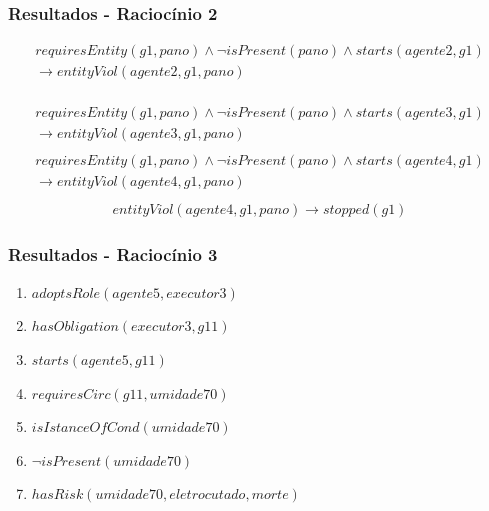 \documentclass{beamer}
\begin{document}
\begin{frame}
	\frametitle{Resultados - Raciocínio 2}
	\begin{eqnarray}\nonumber
		requiresEntity(g1,pano) \wedge \neg isPresent(pano) \wedge starts(agente2,g1)  \nonumber \\ 
		\to entityViol(agente2,g1,pano) \nonumber \\ 	    
	\end{eqnarray}

	\begin{eqnarray}\nonumber
		requiresEntity(g1,pano) \wedge \neg isPresent(pano) \wedge starts(agente3,g1) \nonumber \\ 
	    \to entityViol(agente3,g1,pano) \nonumber \\
	\end{eqnarray}
	\begin{eqnarray}\nonumber
		requiresEntity(g1,pano) \wedge \neg isPresent(pano) \wedge starts(agente4,g1) \nonumber \\ 
	    \to entityViol(agente4,g1,pano)  \nonumber \\	
	\end{eqnarray}
	\begin{eqnarray}
		entityViol(agente4,g1,pano) \to stopped(g1)
	\end{eqnarray}
\end{frame}

\begin{frame}
	\frametitle{Resultados - Raciocínio 3}
	\begin{enumerate}
		\item $adoptsRole(agente5,executor3)$
		\item $hasObligation(executor3,g11)$	
		\item $starts(agente5,g11)$ 
		\item $requiresCirc(g11,umidade70)$
		\item $isIstanceOfCond(umidade70)$
		\item $\neg isPresent(umidade70)$
		\item $hasRisk(umidade70,eletrocutado,morte)$
	\end{enumerate}
\end{frame}
\end{document}
